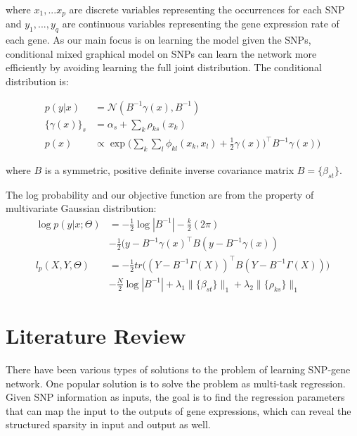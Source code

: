 \documentclass{article}
\begin{document}
where $x_1, ... x_p$ are discrete variables representing the occurrences for each SNP and $y_1, ..., y_q$ are continuous variables representing the gene expression rate of each gene. As our main focus is on learning the model given the SNPs, conditional mixed graphical model on SNPs can learn the network more efficiently by avoiding learning the full joint distribution. The conditional distribution is:

\begin{align}
p(y|x) &= \mathcal{N}(B^{-1}\gamma(x), B^{-1}) \label{eq:cond_prob}\\
\{\gamma(x)\}_s &= \alpha_s + \sum_{k} \rho_{ks}(x_k) \\
p(x) &\propto \exp \Big( \sum_{k} \sum_{l} \phi_{kl}(x_k, x_l) + \frac{1}{2} \gamma(x))^\intercal B^{-1} \gamma(x) \Big)
\end{align}

where $B$ is a symmetric, positive definite inverse covariance matrix $B = \{ \beta_{st}\}$.

The log probability and our objective function are from the property of multivariate Gaussian distribution:
\begin{align}
\log p(y | x; \Theta) &= -\frac{1}{2}\log |B^{-1}| -\frac{k}{2} (2 \pi) \nonumber    \\
& -\frac{1}{2} (y - B^{-1} \gamma(x)^\intercal B (y - B^{-1} \gamma(x)) \\
l_p(X, Y, \Theta) &= -\frac{1}{2} tr\Big((Y - B^{-1} \Gamma(X))^\intercal B (Y - B^{-1} \Gamma(X)) \Big) \nonumber \\
& -\frac{N}{2} \log|B^{-1}| + \lambda_1 \|\{\beta_{st}\}\|_1 + \lambda_2 \|\{\rho_{ks}\}\|_1 \label{eq:obj}
\end{align}

\section{Literature Review}
\label{LiteratureReview}

There have been various types of solutions to the problem of learning SNP-gene network. One popular solution is to solve the problem as multi-task regression.
Given SNP information as inputs, the goal is to find the regression parameters that can map the input to the outputs of gene expressions, which can reveal the structured sparsity in input and output as well.

\end{document}
